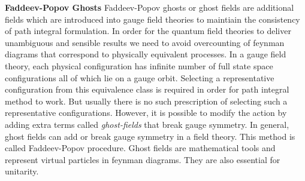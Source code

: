 \begin{description}
\textbf{Faddeev-Popov Ghosts}
Faddeev-Popov ghosts or ghost fields are additional fields which are introduced into gauge field theories to maintiain the consistency of path integral formulation. In order for the quantum field theories to deliver unambiguous and sensible results we need to avoid overcounting of feynman diagrams that correspond to physically equivalent processes. In a gauge field theory, each physical configuration has infinite number of full state space configurations all of which lie on a gauge orbit. Selecting a representative configuration from this equivalence class is required in order for path integral method to work. But usually there is no such prescription of selecting such a representative configurations. However, it is possible to modify the action by adding extra terms called \emph{ghost-fields} that break gauge symmetry. In general, ghost fields can add or break gauge symmetry in a field theory. This method is called Faddeev-Popov procedure. Ghost fields are mathematical tools and represent virtual particles in feynman diagrams. They are also essential for unitarity. 


\end{description}
